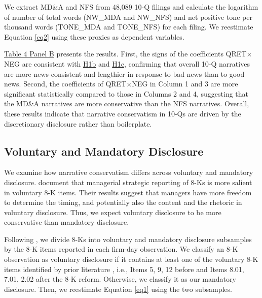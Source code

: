 \documentclass[letterpaper,12pt]{article}
\begin{document}
\begin{spacing}{1.5}
We extract MD\&A and NFS from 48,089 10-Q filings and calculate the logarithm of number of total words (NW\_MDA and NW\_NFS) and net positive tone per thousand words (TONE\_MDA and TONE\_NFS) for each filing. We reestimate Equation \eqref{eq2} using these proxies as dependent variables.

\hyperref[T4PB]{Table 4 Panel B} presents the results. First, the signs of the coefficients QRET$\times$NEG are consistent with \hyperref[hyp:h1b]{H1b} and \hyperref[hyp:h1c]{H1c}, confirming that overall 10-Q narratives are more news-consistent and lengthier in response to bad news than to good news. Second, the coefficients of QRET$\times$NEG in Column 1 and 3 are more significant statistically compared to those in Columns 2 and 4, suggesting that the MD\&A narratives are more conservative than the NFS narratives. Overall, these results indicate that narrative conservatism in 10-Qs are driven by the discretionary disclosure rather than boilerplate.

\subsection{Voluntary and Mandatory Disclosure}
\noindent We examine how narrative conservatism differs across voluntary and mandatory disclosure.  document that managerial strategic reporting of 8-Ks is more salient in voluntary 8-K items. Their results suggest that managers have more freedom to determine the timing, and potentially also the content and the rhetoric in voluntary disclosure. Thus, we expect voluntary disclosure to be more conservative than mandatory disclosure.

Following , we divide 8-Ks into voluntary and mandatory disclosure subsamples by the 8-K items reported in each firm-day observation. We classify an 8-K observation as voluntary disclosure if it contains at least one of the voluntary 8-K items identified by prior literature \cite{lermanNewForm8K2010, heMeasuringDisclosureUsing2020}, i.e., Items 5, 9, 12 before and Items 8.01, 7.01, 2.02 after the 8-K reform. Otherwise, we classify it as our mandatory disclosure. Then, we reestimate Equation \eqref{eq1} using the two subsamples. 


\end{spacing}
\end{document}
